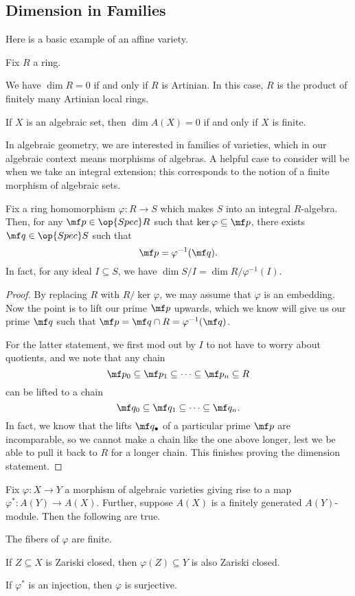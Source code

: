 \subsection{Dimension in Families}
Here is a basic example of an affine variety.
\begin{proposition}
	Fix $R$ a ring.
	\begin{listalph}
		\item We have $\dim R=0$ if and only if $R$ is Artinian. In this case, $R$ is the product of finitely many Artinian local rings.
		\item If $X$ is an algebraic set, then $\dim A(X)=0$ if and only if $X$ is finite.
	\end{listalph}
\end{proposition}
In algebraic geometry, we are interested in families of varieties, which in our algebraic context means morphisms of algebras. A helpful case to consider will be when we take an integral extension; this corresponds to the notion of a finite morphism of algebraic sets.
\begin{proposition}
	Fix a ring homomorphism $\varphi:R\to S$ which makes $S$ into an integral $R$-algebra. Then, for any $\mf p\in\op{Spec}R$ such that $\ker\varphi\subseteq\mf p$, there exists $\mf q\in\op{Spec}S$ such that
	\[\mf p=\varphi^{-1}(\mf q).\]
	In fact, for any ideal $I\subseteq S$, we have $\dim S/I=\dim R/\varphi^{-1}(I)$.
\end{proposition}
\begin{proof}
	By replacing $R$ with $R/\ker\varphi$, we may assume that $\varphi$ is an embedding. Now the point is to lift our prime $\mf p$ upwards, which we know will give us our prime $\mf q$ such that $\mf p=\mf q\cap R=\varphi^{-1}(\mf q)$.

	For the latter statement, we first mod out by $I$ to not have to worry about quotients, and we note that any chain
	\[\mf p_0\subseteq\mf p_1\subseteq\cdots\subseteq\mf p_n\subseteq R\]
	can be lifted to a chain
	\[\mf q_0\subseteq\mf q_1\subseteq\cdots\subseteq\mf q_n.\]
	In fact, we know that the lifts $\mf q_\bullet$ of a particular prime $\mf p$ are incomparable, so we cannot make a chain like the one above longer, lest we be able to pull it back to $R$ for a longer chain. This finishes proving the dimension statement.
\end{proof}
\begin{corollary}
	Fix $\varphi:X\to Y$ a morphism of algebraic varieties giving rise to a map $\varphi^*:A(Y)\to A(X)$. Further, suppose $A(X)$ is a finitely generated $A(Y)$-module. Then the following are true.
	\begin{listalph}
		\item The fibers of $\varphi$ are finite.
		\item If $Z\subseteq X$ is Zariski closed, then $\varphi(Z)\subseteq Y$ is also Zariski closed.
		\item If $\varphi^*$ is an injection, then $\varphi$ is surjective.
	\end{listalph}
\end{corollary}
